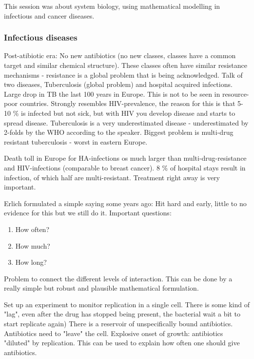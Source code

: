 \documentclass[12p]{article}
\begin{document}
This session was about system biology, using mathematical modelling in infectious and cancer diseases.

\subsubsection*{Infectious diseases}

Post-atibiotic era: No new antibiotics (no new classes, classes have a common target and similar chemical structure).
These classes often have similar resistance mechanisms - resistance is a global problem that is being acknowledged.
Talk of two diseases, Tuberculosis (global problem) and hospital acquired infections.
Large drop in TB the last 100 years in Europe.
This is not to be seen in resource-poor countries. 
Strongly resembles HIV-prevalence, the reason for this is that 5-10 \% is infected but not sick, but with HIV you develop disease and starts to spread disease.
Tuberculosis is a very underestimated disease - underestimated by 2-folds by the WHO according to the speaker.
Biggest problem is multi-drug resistant tuberculosis - worst in eastern Europe. 

Death toll in Europe for HA-infections os much larger than multi-drug-resistance and HIV-infections (comparable to breast cancer).
8 \% of hospital stays result in infection, of which half are multi-resistant.
Treatment right away is very important.

Erlich formulated a simple saying some years ago: Hit hard and early, little to no evidence for this but we still do it.
Important questions: 

\begin{enumerate}
    \item
	How often?
    \item
	How much?
    \item
	How long?
\end{enumerate}

Problem to connect the different levels of interaction.
This can be done by a really simple but robust and plausible mathematical formulation.

Set up an experiment to monitor replication in a single cell.
There is some kind of "lag", even after the drug has stopped being present, the bacterial wait a bit to start replicate again)
There is a reservoir of unspecifically bound antibiotics.
Antibiotics need to "leave" the cell.
Explosive onset of growth: antibiotics "diluted" by replication.
This can be used to explain how often one should give antibiotics.
\end{document}

